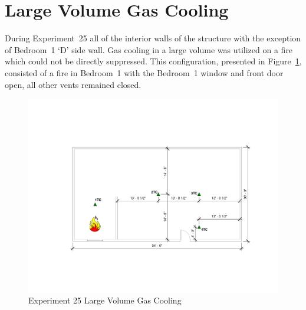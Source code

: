 \documentclass[12pt,oneside]{book}
\begin{document}
\clearpage

\section{Large Volume Gas Cooling}
During Experiment~25 all of the interior walls of the structure with the exception of Bedroom~1 `D' side wall. Gas cooling in a large volume was utilized on a fire which could not be directly suppressed. This configuration, presented in Figure~\ref{fig:Gas_Cooling}, consisted of a fire in Bedroom~1 with the Bedroom~1 window and front door open, all other vents remained closed.  

\begin{figure}[H]
\centering
\includegraphics[width=5in]{../0_Images/Ventilation_Configurations/Gas_Cooling}
\caption{Experiment 25 Large Volume Gas Cooling}
\label{fig:Gas_Cooling}
\end{figure}
\end{document}
